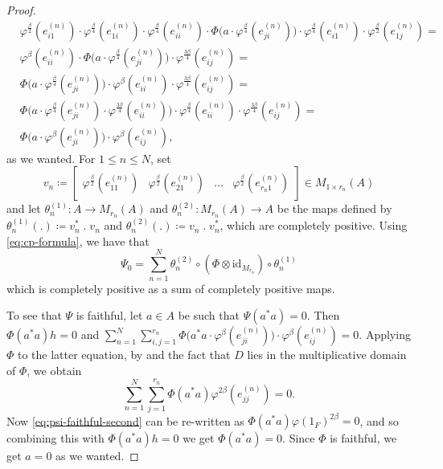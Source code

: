 \documentclass[11pt,a4paper]{amsart}
\theoremstyle{definition}
\numberwithin{equation}{section}
\begin{document}
\begin{proof}
\begin{align*}
& \varphi^\frac{\beta}{2}(e_{i1}^{(n)}) \cdot \varphi^\frac{\beta}{4}(e_{1i}^{(n)}) \cdot \varphi^\frac{\beta}{4}(e_{ii}^{(n)}) \cdot \Phi\big(a \cdot \varphi^\frac{\beta}{4}(e_{ji}^{(n)})\big)\cdot \varphi^\frac{\beta}{4}(e_{i1}^{(n)})\cdot \varphi^\frac{\beta}{2}(e_{1j}^{(n)})=\\
&\varphi^\beta(e_{ii}^{(n)})\cdot \Phi\big(a \cdot \varphi^\frac{\beta}{4}(e_{ji}^{(n)})\big) \cdot \varphi^\frac{3\beta}{4}(e_{ij}^{(n)})=\\
&\Phi\big(a\cdot \varphi^\frac{\beta}{4}(e_{ji}^{(n)})\big) \cdot \varphi^\beta(e_{ii}^{(n)}) \cdot \varphi^\frac{3\beta}{4}(e_{ij}^{(n)})=\\
&\Phi\big(a \cdot \varphi^\frac{\beta}{4}(e_{ji}^{(n)})\cdot \varphi^\frac{3\beta}{4}(e_{ii}^{(n)})\big) \cdot \varphi^\frac{\beta}{4}(e_{ii}^{(n)}) \cdot \varphi^\frac{3\beta}{4}(e_{ij}^{(n)})=\\
&\Phi\big(a \cdot \varphi^\beta(e_{ji}^{(n)})\big)\cdot \varphi^\beta(e_{ij}^{(n)}),
\end{align*}
as we wanted. For $1\le n\le N$, set
\begin{equation}
v_n\coloneqq\begin{bmatrix}\varphi^\frac{\beta}{2}(e_{11}^{(n)})&\varphi^\frac{\beta}{2}(e_{21}^{(n)})&\dots & \varphi^\frac{\beta}{2}(e_{r_n1}^{(n)}) \end{bmatrix}\in M_{1\times r_n}(A)
\end{equation}
and let $\theta_n^{(1)}\colon A\to M_{r_n}(A)$ and $\theta_n^{(2)}\colon M_{r_n}(A)\to A$ be the maps defined by $\theta_n^{(1)}(.)\coloneqq v_n^*\; .\; v_n$ and $\theta_n^{(2)}(.)\coloneqq v_n \; . \; v_n^*$, which are completely positive. Using \eqref{eq:cp-formula}, we have that
\begin{equation}
\Psi_0 = \sum_{n=1}^N\theta_n^{(2)}\circ (\Phi\otimes\mathrm{id}_{M_{r_n}})\circ \theta_n^{(1)}
\end{equation}
which is completely positive as a sum of completely positive maps.

To see that $\Psi$ is faithful, let $a\in A$ be such that $\Psi(a^*a)=0$. Then $\Phi(a^*a)h=0$ and $\sum_{n=1}^N\sum_{i,j=1}^{r_n}\Phi\big(a^*a\cdot \varphi^\beta(e_{ji}^{(n)})\big)\cdot \varphi^\beta(e_{ij}^{(n)})=0$. Applying $\Phi$ to the latter equation, by  and the fact that $D$ lies in the multiplicative domain of $\Phi$, we obtain
\begin{equation}\label{eq:psi-faithful-second}
\sum_{n=1}^N\sum_{j=1}^{r_n}\Phi(a^*a)\varphi^{2\beta}(e_{jj}^{(n)})=0.
\end{equation}
Now \eqref{eq:psi-faithful-second} can be re-written as $\Phi(a^*a)\varphi(1_F)^{2\beta}=0$, and so combining this with $\Phi(a^*a)h=0$ we get $\Phi(a^*a)=0$. Since $\Phi$ is faithful, we get $a=0$ as we wanted.


\end{proof}
\end{document}
